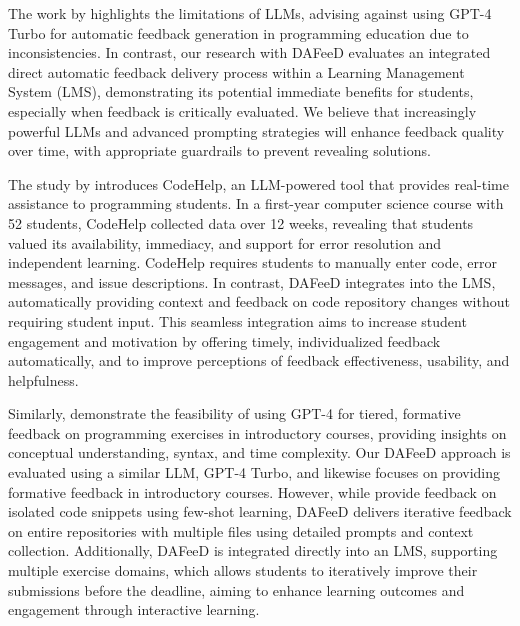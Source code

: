 \documentclass[manuscript,screen,review]{acmart}
\begin{document}
The work by \citet{azaiz:2024:FeedbackGenerationProgrammingExercises} highlights the limitations of LLMs, advising against using GPT-4 Turbo for automatic feedback generation in programming education due to inconsistencies. In contrast, our research with DAFeeD evaluates an integrated direct automatic feedback delivery process within a Learning Management System (LMS), demonstrating its potential immediate benefits for students, especially when feedback is critically evaluated. We believe that increasingly powerful LLMs and advanced prompting strategies will enhance feedback quality over time, with appropriate guardrails to prevent revealing solutions.


The study by \citet{liffiton:2024:CodeHelpUsingLarge} introduces CodeHelp, an LLM-powered tool that provides real-time assistance to programming students. In a first-year computer science course with 52 students, CodeHelp collected data over 12 weeks, revealing that students valued its availability, immediacy, and support for error resolution and independent learning. CodeHelp requires students to manually enter code, error messages, and issue descriptions. In contrast, DAFeeD integrates into the LMS, automatically providing context and feedback on code repository changes without requiring student input. This seamless integration aims to increase student engagement and motivation by offering timely, individualized feedback automatically, and to improve perceptions of feedback effectiveness, usability, and helpfulness.


Similarly, \citet{nguyen:2024:UsingGPT4Providea} demonstrate the feasibility of using GPT-4 for tiered, formative feedback on programming exercises in introductory courses, providing insights on conceptual understanding, syntax, and time complexity. Our DAFeeD approach is evaluated using a similar LLM, GPT-4 Turbo, and likewise focuses on providing formative feedback in introductory courses. However, while \citeauthor{nguyen:2024:UsingGPT4Providea} provide feedback on isolated code snippets using few-shot learning, DAFeeD delivers iterative feedback on entire repositories with multiple files using detailed prompts and context collection. Additionally, DAFeeD is integrated directly into an LMS, supporting multiple exercise domains, which allows students to iteratively improve their submissions before the deadline, aiming to enhance learning outcomes and engagement through interactive learning.
\end{document}
